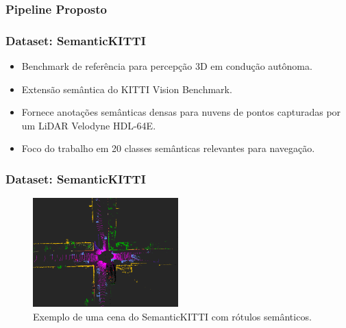 \documentclass[aspectratio=169,t,xcolor=table]{beamer}
\begin{document}
\begin{frame}
    \frametitle{Pipeline Proposto}
    \begin{figure}
        \centering
    \end{figure}
\end{frame}

\begin{frame}
    \frametitle{Dataset: SemanticKITTI}
    \begin{itemize}
        \item<+-> Benchmark de referência para percepção 3D em condução autônoma.
        \item<+-> Extensão semântica do KITTI Vision Benchmark.
        \item<+-> Fornece anotações semânticas densas para nuvens de pontos capturadas por um LiDAR Velodyne HDL-64E.
        \item<+-> Foco do trabalho em 20 classes semânticas relevantes para navegação.
    \end{itemize}
\end{frame}

\begin{frame}
    \frametitle{Dataset: SemanticKITTI}
    \begin{figure}
        \centering
        \includegraphics [width=0.5\textwidth]{figs/final-true1t.png}
        \caption {Exemplo de uma cena do SemanticKITTI com rótulos semânticos.}
    \end{figure}
\end{frame}
\end{document}
